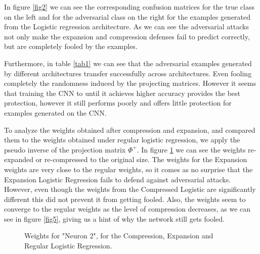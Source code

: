 \documentclass{asaproc}
\begin{document}
In figure \ref{fig2} we can see the corresponding confusion matrices for the true class on the left and for the adversarial class on the right for the examples generated from the Logistic regression architecture. As we can see the adversarial attacks not only make the expansion and compression defenses fail to predict correctly, but are completely fooled by the examples.

Furthermore, in table \ref{tab1} we can see that the adversarial examples generated by different architectures transfer successfully across architectures. Even fooling completely the randomness induced by the projecting matrices. However it seems that training the CNN to until it achieves higher accuracy provides the best protection, however it still performs poorly and offers little protection for examples generated on the CNN.

To analyze the weights obtained after compression and expansion, and compared them to the weights obtained under regular logistic regression, we apply the pseudo inverse of the projection matrix $ \Phi^+ $. In figure \ref{fig4} we can see the weights re-expanded or re-compressed to the original size. The weights for the Expansion weights are very close to the regular weights, so it comes as no surprise that the Expansion Logistic Regression fails to defend against adversarial attacks. However, even though the weights from the Compressed Logistic are significantly different this did not prevent it from getting fooled. Also, the weights seem to converge to the regular weights as the level of compression decreases, as we can see in figure \ref{fig5}, giving us a hint of why the network still gets fooled.

\begin{figure}[h!]
	\centering
	\caption{\enspace Weights for "Neuron 2", for the Compression, Expansion and Regular Logistic Regression.}
	\label{fig4} 
\end{figure}
\end{document}
